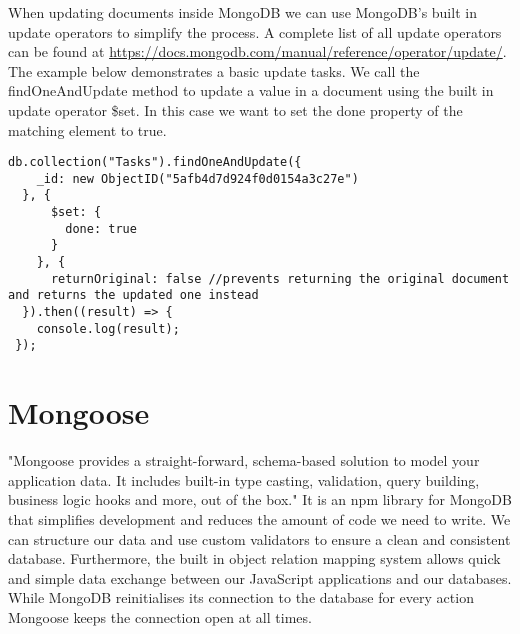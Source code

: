 \documentclass[11pt]{article}
\begin{document}
When updating documents inside MongoDB we can use MongoDB's built in update operators to simplify the process. A complete list of all update operators can be found at \url{https://docs.mongodb.com/manual/reference/operator/update/}. The example below demonstrates a basic update tasks. We call the findOneAndUpdate method to update a value in a document using the built in update operator \$set. In this case we want to set the done property of the matching element to true. 

\begin{lstlisting}
db.collection("Tasks").findOneAndUpdate({
    _id: new ObjectID("5afb4d7d924f0d0154a3c27e")
  }, {
      $set: {
        done: true
      }
    }, {
      returnOriginal: false //prevents returning the original document and returns the updated one instead
  }).then((result) => {
    console.log(result);
 });
\end{lstlisting}
 




\section{Mongoose}
"Mongoose provides a straight-forward, schema-based solution to model your application data. It includes built-in type casting, validation, query building, business logic hooks and more, out of the box." \cite{mongooseintro} It is an npm library for MongoDB that simplifies development and reduces the amount of code we need to write. We can structure our data and use custom validators to ensure a clean and consistent database. Furthermore, the built in object relation mapping system allows quick and simple data exchange between our JavaScript applications and our databases. While MongoDB reinitialises its connection to the database for every action Mongoose keeps the connection open at all times. 
\end{document}
